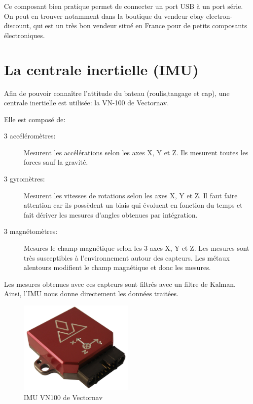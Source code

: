 \documentclass[a4paper, 11pt]{report}
\begin{document}
Ce composant bien pratique permet de connecter un port USB à un port
série. On peut en trouver notamment dans la boutique du vendeur ebay
electron-discount, qui est un très bon vendeur situé en France pour
de petits composants électroniques.

\section{La centrale inertielle (IMU)}
Afin de pouvoir connaître l'attitude du bateau (roulis,tangage et cap), une centrale inertielle est utilisée: la VN-100 de Vectornav.

Elle est composé de:
\begin{description}
\item[3 accéléromètres:]Mesurent les accélérations selon les axes X, Y et Z. Ils mesurent toutes les forces sauf la gravité.
\item[3 gyromètres:]Mesurent les vitesses de rotations selon les axes X, Y et Z. Il faut faire attention car ils possèdent un biais qui évoluent en fonction du temps et fait dériver les mesures d'angles obtenues par intégration.
\item[3 magnétomètres:]Mesures le champ magnétique selon les 3 axes X, Y et Z. Les mesures sont très susceptibles à l'environnement autour des capteurs. Les métaux alentours modifient le champ magnétique et donc les mesures.
\end{description}

Les mesures obtenues avec ces capteurs sont filtrés avec un filtre de Kalman. Ainsi, l'IMU nous donne directement les données traitées.

\begin{figure}[h]
	\begin{center}
		\includegraphics[width=0.5\textwidth]{images/IMU.jpg}
		\caption{IMU VN100 de Vectornav}
	\end{center}
\end{figure}
\end{document}
